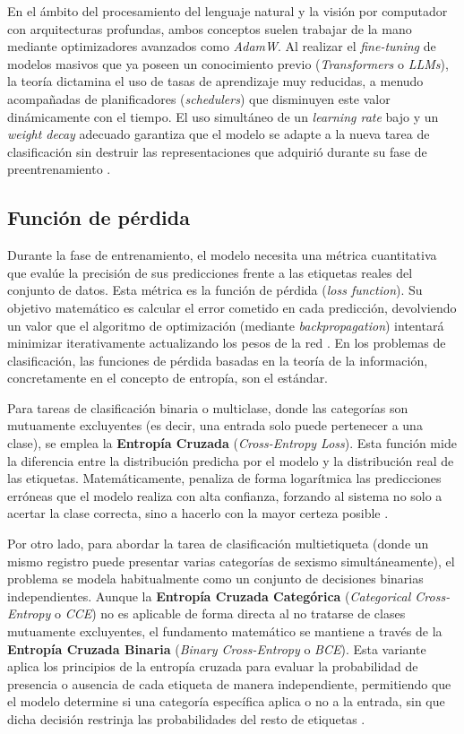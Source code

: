 En el ámbito del procesamiento del lenguaje natural y la visión por computador con arquitecturas profundas, ambos conceptos suelen trabajar de la mano mediante optimizadores avanzados como \textit{AdamW}. Al realizar el \textit{fine-tuning} de modelos masivos que ya poseen un conocimiento previo (\textit{Transformers} o \textit{LLMs}), la teoría dictamina el uso de tasas de aprendizaje muy reducidas, a menudo acompañadas de planificadores (\textit{schedulers}) que disminuyen este valor dinámicamente con el tiempo. El uso simultáneo de un \textit{learning rate} bajo y un \textit{weight decay} adecuado garantiza que el modelo se adapte a la nueva tarea de clasificación sin destruir las representaciones que adquirió durante su fase de preentrenamiento \cite{loshchilov2017decoupled}. 

\subsection{Función de pérdida}
\label{subsec:LossFunction}
Durante la fase de entrenamiento, el modelo necesita una métrica cuantitativa que evalúe la precisión de sus predicciones frente a las etiquetas reales del conjunto de datos. Esta métrica es la función de pérdida (\textit{loss function}). Su objetivo matemático es calcular el error cometido en cada predicción, devolviendo un valor que el algoritmo de optimización (mediante \textit{backpropagation}) intentará minimizar iterativamente actualizando los pesos de la red \cite{shalev2014understanding}. En los problemas de clasificación, las funciones de pérdida basadas en la teoría de la información, concretamente en el concepto de entropía, son el estándar. 

Para tareas de clasificación binaria o multiclase, donde las categorías son mutuamente excluyentes (es decir, una entrada solo puede pertenecer a una clase), se emplea la \textbf{Entropía Cruzada} (\textit{Cross-Entropy Loss}). Esta función mide la diferencia entre la distribución predicha por el modelo y la distribución real de las etiquetas. Matemáticamente, penaliza de forma logarítmica las predicciones erróneas que el modelo realiza con alta confianza, forzando al sistema no solo a acertar la clase correcta, sino a hacerlo con la mayor certeza posible \cite{murphy2012machine}. 

Por otro lado, para abordar la tarea de clasificación multietiqueta (donde un mismo registro puede presentar varias categorías de sexismo simultáneamente), el problema se modela habitualmente como un conjunto de decisiones binarias independientes. Aunque la \textbf{Entropía Cruzada Categórica} (\textit{Categorical Cross-Entropy} o \textit{CCE}) no es aplicable de forma directa al no tratarse de clases mutuamente excluyentes, el fundamento matemático se mantiene a través de la \textbf{Entropía Cruzada Binaria} (\textit{Binary Cross-Entropy} o \textit{BCE}). Esta variante aplica los principios de la entropía cruzada para evaluar la probabilidad de presencia o ausencia de cada etiqueta de manera independiente, permitiendo que el modelo determine si una categoría específica aplica o no a la entrada, sin que dicha decisión restrinja las probabilidades del resto de etiquetas \cite{nam2014large}.

